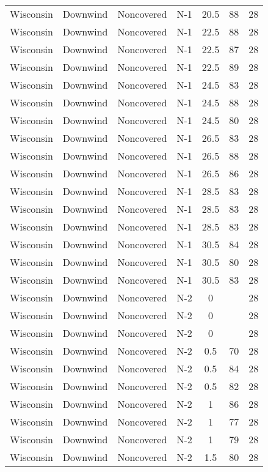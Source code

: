 \documentclass{article}
\begin{document}
\begin{longtable}[H]{ccccccc}
Wisconsin & Downwind & Noncovered & N-1 & 20.5 & 88  & 28 \\
Wisconsin & Downwind & Noncovered & N-1 & 22.5 & 88  & 28 \\
Wisconsin & Downwind & Noncovered & N-1 & 22.5 & 87  & 28 \\
Wisconsin & Downwind & Noncovered & N-1 & 22.5 & 89  & 28 \\
Wisconsin & Downwind & Noncovered & N-1 & 24.5 & 83  & 28 \\
Wisconsin & Downwind & Noncovered & N-1 & 24.5 & 88  & 28 \\
Wisconsin & Downwind & Noncovered & N-1 & 24.5 & 80  & 28 \\
Wisconsin & Downwind & Noncovered & N-1 & 26.5 & 83  & 28 \\
Wisconsin & Downwind & Noncovered & N-1 & 26.5 & 88  & 28 \\
Wisconsin & Downwind & Noncovered & N-1 & 26.5 & 86  & 28 \\
Wisconsin & Downwind & Noncovered & N-1 & 28.5 & 83  & 28 \\
Wisconsin & Downwind & Noncovered & N-1 & 28.5 & 83  & 28 \\
Wisconsin & Downwind & Noncovered & N-1 & 28.5 & 83  & 28 \\
Wisconsin & Downwind & Noncovered & N-1 & 30.5 & 84  & 28 \\
Wisconsin & Downwind & Noncovered & N-1 & 30.5 & 80  & 28 \\
Wisconsin & Downwind & Noncovered & N-1 & 30.5 & 83  & 28 \\
Wisconsin & Downwind & Noncovered & N-2 & 0    &     & 28 \\
Wisconsin & Downwind & Noncovered & N-2 & 0    &     & 28 \\
Wisconsin & Downwind & Noncovered & N-2 & 0    &     & 28 \\
Wisconsin & Downwind & Noncovered & N-2 & 0.5  & 70  & 28 \\
Wisconsin & Downwind & Noncovered & N-2 & 0.5  & 84  & 28 \\
Wisconsin & Downwind & Noncovered & N-2 & 0.5  & 82  & 28 \\
Wisconsin & Downwind & Noncovered & N-2 & 1    & 86  & 28 \\
Wisconsin & Downwind & Noncovered & N-2 & 1    & 77  & 28 \\
Wisconsin & Downwind & Noncovered & N-2 & 1    & 79  & 28 \\
Wisconsin & Downwind & Noncovered & N-2 & 1.5  & 80  & 28 \\

\end{longtable}
\end{document}
